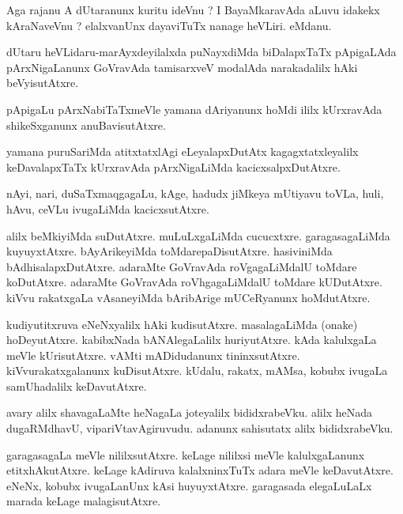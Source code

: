 \documentclass{article}
\begin{document}
\begin{mn}%
Aga rajanu A dUtaranunx kuritu ideVnu ? I BayaMkaravAda aLuvu idakekx kAraNaveVnu ? 
elalxvanUnx dayaviTuTx nanage heVLiri. eMdanu.
\end{mn}

\begin{mn}%
dUtaru heVLidaru-marAyxdeyilalxda puNayxdiMda biDalapxTaTx pApigaLAda pArxNigaLanunx 
GoVravAda tamisarxveV modalAda narakadalilx hAki beVyisutAtxre.
\end{mn}

\begin{mn}%
pApigaLu pArxNabiTaTxmeVle yamana dAriyanunx hoMdi ililx kUrxravAda shikeSxganunx  
anuBavisutAtxre.
\end{mn}

\begin{mn}%
yamana puruSariMda atitxtatxlAgi eLeyalapxDutAtx kagagxtatxleyalilx keDavalapxTaTx 
kUrxravAda pArxNigaLiMda kacicxsalpxDutAtxre.
\end{mn}

\begin{mn}%
nAyi, nari, duSaTxmaqgagaLu, kAge, hadudx jiMkeya mUtiyavu toVLa, huli, hAvu, ceVLu 
ivugaLiMda kacicxsutAtxre.
\end{mn}

\begin{mn}%
alilx beMkiyiMda suDutAtxre. muLuLxgaLiMda cucucxtxre. garagasagaLiMda kuyuyxtAtxre. 
bAyArikeyiMda toMdarepaDisutAtxre. hasiviniMda bAdhisalapxDutAtxre. adaraMte GoVravAda 
roVgagaLiMdalU toMdare koDutAtxre. adaraMte GoVravAda roVhgagaLiMdalU toMdare kUDutAtxre. 
kiVvu rakatxgaLa vAsaneyiMda bAribArige mUCeRyanunx hoMdutAtxre.
\end{mn}

\begin{mn}%
kudiyutitxruva eNeNxyalilx hAki kudisutAtxre. masalagaLiMda (onake) hoDeyutAtxre. 
kabibxNada bANAlegaLalilx  huriyutAtxre. kAda kalulxgaLa meVle kUrisutAtxre. vAMti 
mADidudanunx tininxsutAtxre. kiVvurakatxgalanunx kuDisutAtxre. kUdalu, rakatx, mAMsa, 
kobubx ivugaLa samUhadalilx keDavutAtxre.
\end{mn}

\begin{mn}%
avary alilx shavagaLaMte heNagaLa joteyalilx bididxrabeVku. alilx heNada dugaRMdhavU, 
vipariVtavAgiruvudu. adanunx sahisutatx alilx bididxrabeVku.
\end{mn}

\begin{mn}%
garagasagaLa meVle nililxsutAtxre. keLage nililxsi meVle kalulxgaLanunx etitxhAkutAtxre. 
keLage kAdiruva kalalxninxTuTx adara meVle keDavutAtxre. eNeNx, kobubx ivugaLanUnx kAsi 
huyuyxtAtxre. garagasada elegaLuLaLx marada keLage  malagisutAtxre.
\end{mn}
\end{document}
